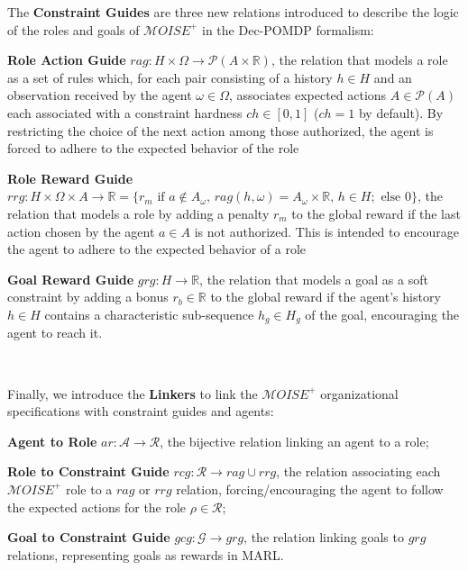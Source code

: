 \documentclass[sigconf]{aamas}
\begin{document}
\noindent The \textbf{Constraint Guides} are three new relations introduced to describe the logic of the roles and goals of $\mathcal{M}OISE^+$ in the Dec-POMDP formalism:
%
\begin{enumerate*}[label={\roman*) },itemjoin={; \quad}]

    \item \textbf{Role Action Guide} \quad $rag: H \times \Omega \rightarrow \mathcal{P}(A \times \mathbb{R})$, the relation that models a role as a set of rules which, for each pair consisting of a history $h \in H$ and an observation received by the agent $\omega \in \Omega$, associates expected actions $A \in \mathcal{P}(A)$ each associated with a constraint hardness $ch \in [0,1]$ ($ch = 1$ by default). By restricting the choice of the next action among those authorized, the agent is forced to adhere to the expected behavior of the role
    \item \textbf{Role Reward Guide} \quad $rrg: H \times \Omega \times A \to \mathbb{R} = \{r_m \text{ if } a \notin A_\omega \text{, } rag(h, \omega) \allowbreak = \allowbreak A_\omega \times \mathbb{R} \text{, } h \in H; \text{ else } 0\}$, the relation that models a role by adding a penalty $r_m$ to the global reward if the last action chosen by the agent $a \in A$ is not authorized. This is intended to encourage the agent to adhere to the expected behavior of a role
    \item \textbf{Goal Reward Guide} \quad $grg: H \rightarrow \mathbb{R}$, the relation that models a goal as a soft constraint by adding a bonus $r_b \in \mathbb{R}$ to the global reward if the agent's history $h \in H$ contains a characteristic sub-sequence $h_g \in H_g$ of the goal, encouraging the agent to reach it.
\end{enumerate*}

\

\noindent Finally, we introduce the \textbf{Linkers} to link the $\mathcal{M}OISE^+$ organizational specifications with constraint guides and agents:
%
\begin{enumerate*}[label={\roman*) },itemjoin={; \quad}]

    \item \textbf{Agent to Role} \quad $ar: \mathcal{A} \to \mathcal{R}$, the bijective relation linking an agent to a role;
    \item \textbf{Role to Constraint Guide} \quad $rcg: \mathcal{R} \rightarrow rag \cup rrg$, the relation associating each $\mathcal{M}OISE^+$ role to a $rag$ or $rrg$ relation, forcing/encouraging the agent to follow the expected actions for the role $\rho \in \mathcal{R}$;
    \item \textbf{Goal to Constraint Guide} \quad $gcg: \mathcal{G} \rightarrow grg$, the relation linking goals to $grg$ relations, representing goals as rewards in MARL.
\end{enumerate*}
\end{document}
